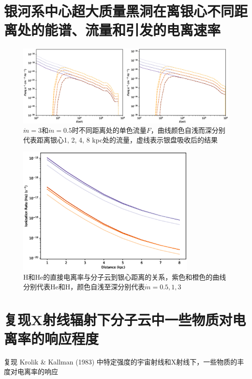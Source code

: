 \documentclass[UTF8]{article}
\begin{document}
\begin{fangsong}
\section{银河系中心超大质量黑洞在离银心不同距离处的能谱、流量和引发的电离速率}
\begin{figure}[H]
	\centering
	\includegraphics[width=\textwidth]{4.eps}
	\caption{$\dot{m}=3$和$\dot{m}=0.5$时不同距离处的单色流量$F$，曲线颜色自浅而深分别代表距离银心1, 2, 4, 8 kpc处的流量，虚线表示银盘吸收后的结果}
\end{figure}
\begin{figure}[H]
	\centering
	\includegraphics[width=0.8\textwidth]{3.eps}
	\caption{H和He的直接电离率与分子云到银心距离的关系，紫色和橙色的曲线分别代表He和H，颜色自浅至深分别代表$\dot{m}=0.5,1,3$}
\end{figure}
\section{复现X射线辐射下分子云中一些物质对电离率的响应程度}
复现 Krolik \& Kallman (1983) 中特定强度的宇宙射线和X射线下，一些物质的丰度对电离率的响应 
\end{fangsong}
\end{document}
